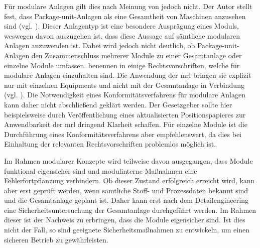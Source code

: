 F\"ur modulare Anlagen gilt dies nach Meinung von \citeauthor{Weber_2016} jedoch nicht. Der Autor stellt fest, dass Package-unit-Anlagen als eine Gesamtheit von Maschinen anzusehen sind {(vgl. \cite[S. 592]{Weber_2016})}. Dieser Anlagentyp ist eine besondere Auspr\"agung eines Moduls, weswegen davon auszugehen ist, dass diese Aussage auf s\"amtliche modularen Anlagen anzuwenden ist. Dabei wird jedoch nicht deutlich, ob Package-unit-Anlagen den Zusammenschluss mehrerer Module zu einer Gesamtanlage oder einzelne Module umfassen. \citeauthor{Kockmann_2017} benennen in  einige Rechtsvorschriften, welche f\"ur modulare Anlagen einzuhalten sind. Die Anwendung der \ac{mrl} bringen sie explizit nur mit einzelnen Equipments und nicht mit der Gesamtanlage in Verbindung {(vgl. \cite[S. 18]{Kockmann_2017})}. Die Notwendigkeit eines Konformit\"atsverfahrens f\"ur modulare Anlagen kann daher nicht abschlie\ss{}end gekl\"art werden. Der Gesetzgeber sollte hier beispielsweise durch Ver\"offentlichung eines aktualisierten Positionspapieres zur Anwendbarkeit der \ac{mrl} dringend Klarheit schaffen. F\"ur einzelne Module ist die Durchf\"uhrung eines Konformit\"atsverfahrens aber empfehlenswert, da dies bei Einhaltung der relevanten Rechtsvorschriften problemlos m\"oglich ist. 

Im Rahmen modularer Konzepte wird teilweise davon ausgegangen, dass Module funktional eigensicher sind und modulinterne Ma\ss{}nahmen eine Fehlerfortpflanzung verhindern. \cite[S. 4]{Urbas_2012a} Ob dieser Zustand erfolgreich erreicht wird, kann aber erst gepr\"uft werden, wenn s\"amtliche Stoff- und Prozessdaten bekannt sind und die Gesamtanlage geplant ist. Daher kann erst nach dem Detailengineering eine Sicherheitsuntersuchung der Gesamtanlage durchgef\"uhrt werden. Im Rahmen dieser ist der Nachweis zu erbringen, dass die Module eigensicher sind. Ist dies nicht der Fall, so sind geeignete Sicherheitsma\ss{}nahmen zu entwickeln, um einen sicheren Betrieb zu gew\"ahrleisten.  

